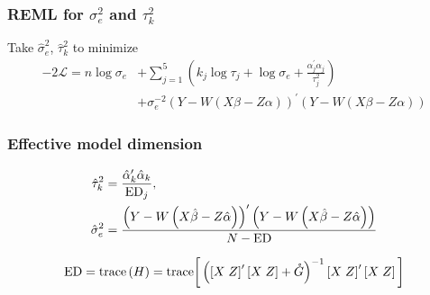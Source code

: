 \documentclass[12pt]{beamer}
\begin{document}
\begin{frame}
\frametitle{REML for $\sigma_e^2$ and $\tau_k^2$ }

Take $\hat{\sigma}_e^2$, $\hat{\tau}_k^2$ to minimize
\begin{align*}
-2\mathcal{L}= n \log \sigma_e &+ \sum_{j=1}^5 \left( k_j \log \tau_j + \log \sigma_e + \frac{\alpha_j^\prime \alpha_j}{\tau_j^2}\right)  \\[5pt]
&+ \sigma_e^{-2}\left(Y - W\left(X\beta - Z\alpha \right) \right)^\prime  \left(Y - W\left(X\beta - Z\alpha \right) \right) 
\end{align*}
\end{frame}


\begin{frame}
\frametitle{Effective model dimension}

\begin{align*}
\hat{\tau}_k^2 &=  \frac{\hat{\alpha}_k^\prime\hat{\alpha}_k}{  \textup{ED}_j}, \\
 \hat{\sigma}_e^2 &= \frac{\left(Y - W\left(X\hat{\beta} - Z\hat{\alpha}\right) \right)^\prime  \left(Y - W\left(X\hat{\beta} - Z\hat{\alpha}\right) \right)}{N - \textup{ED}}
\end{align*}


\begin{align*}
\textup{ED} = \textup{trace}\left( H \right) = \textup{trace}\bigg[\left(\left[X\;Z \right]^\prime\left[X\;Z \right] + \mathring{G} \right)^{-1} \left[X\;Z \right]^\prime\left[X\;Z \right] \bigg] 
\end{align*}

\end{frame}
\end{document}
